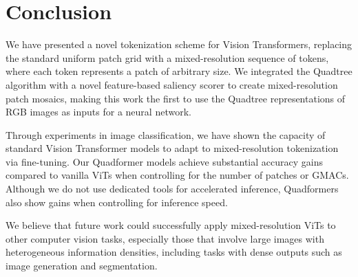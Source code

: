 \section{Conclusion}
We have presented a novel tokenization scheme for Vision Transformers, replacing the standard uniform patch grid with a mixed-resolution sequence of tokens, where each token represents a patch of arbitrary size. We integrated the Quadtree algorithm with a novel feature-based saliency scorer to create mixed-resolution patch mosaics, making this work the first to use the Quadtree representations of RGB images as inputs for a neural network.

Through experiments in image classification, we have shown the capacity of standard Vision Transformer models to adapt to mixed-resolution tokenization via fine-tuning. Our Quadformer models achieve substantial accuracy gains compared to vanilla ViTs when controlling for the number of patches or GMACs. Although we do not use dedicated tools for accelerated inference, Quadformers also show gains when controlling for inference speed.

We believe that future work could successfully apply mixed-resolution ViTs to other computer vision tasks, especially those that involve large images with heterogeneous information densities, including tasks with dense outputs such as image generation and segmentation.
